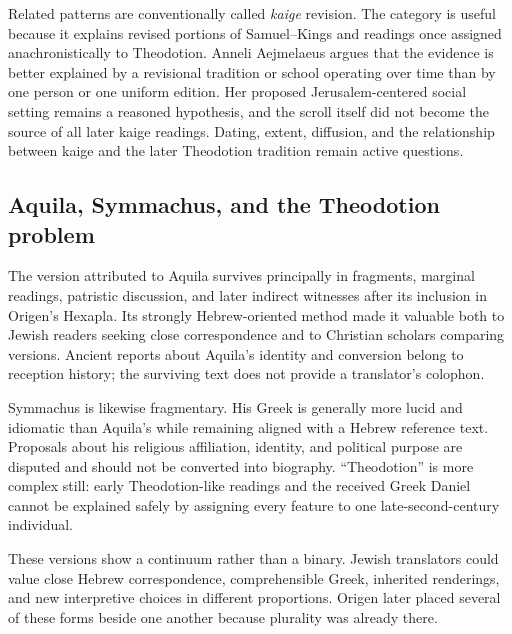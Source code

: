 Related patterns are conventionally called \emph{kaige} revision. The category is useful because it explains revised portions of Samuel--Kings and readings once assigned anachronistically to Theodotion. Anneli Aejmelaeus argues that the evidence is better explained by a revisional tradition or school operating over time than by one person or one uniform edition. Her proposed Jerusalem-centered social setting remains a reasoned hypothesis, and the scroll itself did not become the source of all later kaige readings. Dating, extent, diffusion, and the relationship between kaige and the later Theodotion tradition remain active questions.


\subsection{Aquila, Symmachus, and the Theodotion problem}

The version attributed to Aquila survives principally in fragments, marginal readings, patristic discussion, and later indirect witnesses after its inclusion in Origen's Hexapla. Its strongly Hebrew-oriented method made it valuable both to Jewish readers seeking close correspondence and to Christian scholars comparing versions. Ancient reports about Aquila's identity and conversion belong to reception history; the surviving text does not provide a translator's colophon.

Symmachus is likewise fragmentary. His Greek is generally more lucid and idiomatic than Aquila's while remaining aligned with a Hebrew reference text. Proposals about his religious affiliation, identity, and political purpose are disputed and should not be converted into biography. ``Theodotion'' is more complex still: early Theodotion-like readings and the received Greek Daniel cannot be explained safely by assigning every feature to one late-second-century individual.

These versions show a continuum rather than a binary. Jewish translators could value close Hebrew correspondence, comprehensible Greek, inherited renderings, and new interpretive choices in different proportions. Origen later placed several of these forms beside one another because plurality was already there.

